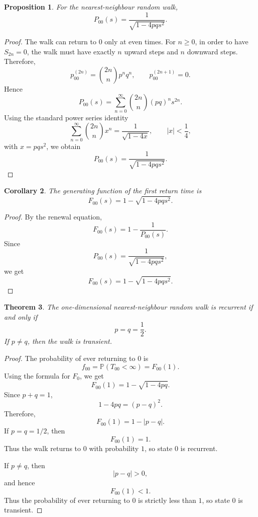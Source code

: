 \documentclass[11pt]{article}
\theoremstyle{plain}
\newtheorem{theorem}{Theorem}[section]
\newtheorem{proposition}[theorem]{Proposition}
\newtheorem{corollary}[theorem]{Corollary}
\theoremstyle{definition}
\theoremstyle{remark}
\begin{document}
	\begin{proposition}
		For the nearest-neighbour random walk,
		\[
		P_{00}(s)
		=
		\frac{1}{\sqrt{1-4pqs^2}}.
		\]
	\end{proposition}
	
	\begin{proof}
		The walk can return to \(0\) only at even times. For \(n\ge 0\), in order to have \(S_{2n}=0\), the walk must have exactly \(n\) upward steps and \(n\) downward steps. Therefore,
		\[
		p_{00}^{(2n)}
		=
		\binom{2n}{n}p^nq^n,
		\qquad
		p_{00}^{(2n+1)}=0.
		\]
		Hence
		\[
		P_{00}(s)
		=
		\sum_{n=0}^{\infty}\binom{2n}{n}(pq)^ns^{2n}.
		\]
		Using the standard power series identity
		\[
		\sum_{n=0}^{\infty}\binom{2n}{n}x^n
		=
		\frac{1}{\sqrt{1-4x}},
		\qquad |x|<\frac14,
		\]
		with \(x=pqs^2\), we obtain
		\[
		P_{00}(s)
		=
		\frac{1}{\sqrt{1-4pqs^2}}.
		\]
	\end{proof}
	
	\begin{corollary}
		The generating function of the first return time is
		\[
		F_{00}(s)
		=
		1-\sqrt{1-4pqs^2}.
		\]
	\end{corollary}
	
	\begin{proof}
		By the renewal equation,
		\[
		F_{00}(s)
		=
		1-\frac{1}{P_{00}(s)}.
		\]
		Since
		\[
		P_{00}(s)
		=
		\frac{1}{\sqrt{1-4pqs^2}},
		\]
		we get
		\[
		F_{00}(s)
		=
		1-\sqrt{1-4pqs^2}.
		\]
	\end{proof}
	
	\begin{theorem}
		The one-dimensional nearest-neighbour random walk is recurrent if and only if
		\[
		p=q=\frac12.
		\]
		If \(p\neq q\), then the walk is transient.
	\end{theorem}
	
	\begin{proof}
		The probability of ever returning to \(0\) is
		\[
		f_{00}
		=
		\mathbb{P}(T_{00}<\infty)
		=
		F_{00}(1).
		\]
		Using the formula for \(F_0\), we get
		\[
		F_{00}(1)
		=
		1-\sqrt{1-4pq}.
		\]
		Since \(p+q=1\),
		\[
		1-4pq
		=
		(p-q)^2.
		\]
		Therefore,
		\[
		F_{00}(1)
		=
		1-|p-q|.
		\]
		If \(p=q=1/2\), then
		\[
		F_{00}(1)=1.
		\]
		Thus the walk returns to \(0\) with probability \(1\), so state \(0\) is recurrent.
		
		If \(p\neq q\), then
		\[
		|p-q|>0,
		\]
		and hence
		\[
		F_{00}(1)<1.
		\]
		Thus the probability of ever returning to \(0\) is strictly less than \(1\), so state \(0\) is transient.
	\end{proof}
	
\end{document}
